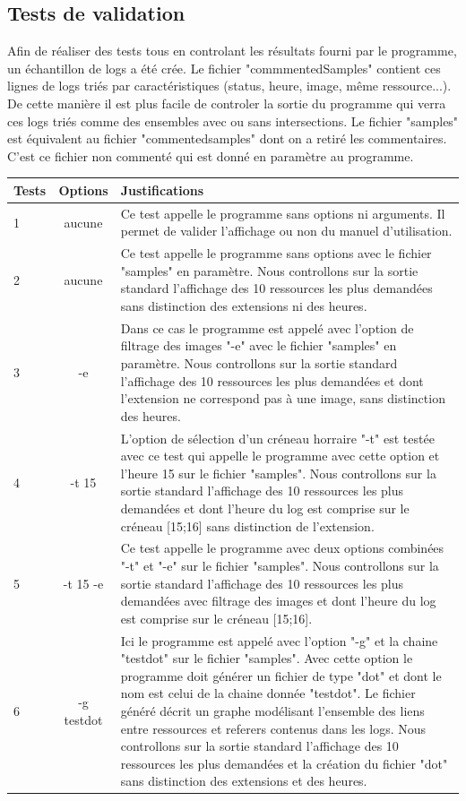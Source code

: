 \documentclass[a4paper]{article}
\begin{document}
\begin{appendix}
\section{Tests de validation}\noindent
Afin de réaliser des tests tous en controlant les résultats fourni par le programme, un échantillon de logs a été crée.
Le fichier "commmentedSamples" contient ces lignes de logs triés par caractéristiques (status, heure, image, même ressource...). De cette manière il est plus facile de controler la sortie du programme qui verra ces logs triés comme des ensembles avec ou sans intersections.
Le fichier "samples" est équivalent au fichier "commentedsamples" dont on a retiré les commentaires. C'est ce fichier non commenté qui est donné en paramètre au programme.
\bigskip
\vspace*{\fill}

\begin{tabular}{|l|c|m{10cm}|}
\hline
\bf Tests & \bf Options & \bf Justifications\\
\hline
1		 & aucune 	    & Ce test appelle le programme sans options ni arguments. Il permet de valider l'affichage ou non du manuel d'utilisation.\\
\hline
2		 & aucune		& Ce test appelle le programme sans options avec le fichier "samples" en paramètre. Nous controllons sur la sortie standard l'affichage 						  des 10 ressources les plus demandées sans distinction des extensions ni des heures. \\
\hline
3		 & -e 			& Dans ce cas le programme est appelé avec l'option de filtrage des images "-e" avec le fichier "samples" en paramètre. Nous 									  controllons sur la sortie standard l'affichage des 10 ressources les plus demandées et dont l'extension ne correspond pas à une 								  image, sans distinction des heures. \\
\hline
4		& -t 15			& L'option de sélection d'un créneau horraire "-t" est testée avec ce test qui appelle le programme avec cette option et l'heure 15 sur 						  le fichier "samples". Nous controllons sur la sortie standard l'affichage des 10 ressources les plus demandées et dont l'heure du log 						  est comprise sur le créneau [15;16] sans distinction de l'extension. \\
\hline
5		& -t 15 -e		& Ce test appelle le programme avec deux options combinées "-t" et "-e" sur le fichier "samples". Nous controllons sur la sortie 								standard l'affichage des 10 ressources les plus demandées avec filtrage des images et dont l'heure du log est comprise sur le créneau 							[15;16].\\
\hline
6		& -g testdot		& Ici le programme est appelé avec l'option "-g" et la chaine "testdot" sur le fichier "samples". Avec cette option le programme doit 							  générer un fichier de type "dot" et dont le nom est celui de la chaine donnée "testdot". Le fichier généré décrit un graphe 									  modélisant l'ensemble des liens entre ressources et referers contenus dans les logs. Nous controllons sur la sortie standard 								  l'affichage des 10 ressources les plus demandées et la création du fichier "dot" sans distinction des extensions et des heures.\\
\hline


\end{tabular}
\end{appendix}
\end{document}

